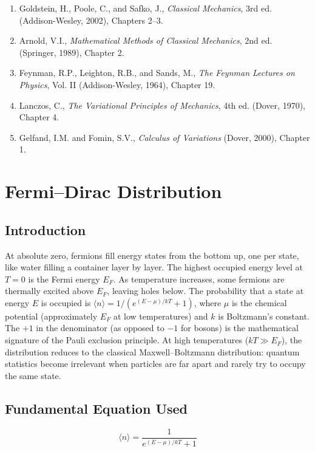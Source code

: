 \documentclass[11pt,openright]{book}
\begin{document}
\begin{enumerate}
\item Goldstein, H., Poole, C., and Safko, J., \textit{Classical Mechanics}, 3rd ed. (Addison-Wesley, 2002), Chapters 2--3.
\item Arnold, V.I., \textit{Mathematical Methods of Classical Mechanics}, 2nd ed. (Springer, 1989), Chapter 2.
\item Feynman, R.P., Leighton, R.B., and Sands, M., \textit{The Feynman Lectures on Physics}, Vol. II (Addison-Wesley, 1964), Chapter 19.
\item Lanczos, C., \textit{The Variational Principles of Mechanics}, 4th ed. (Dover, 1970), Chapter 4.
\item Gelfand, I.M. and Fomin, S.V., \textit{Calculus of Variations} (Dover, 2000), Chapter 1.
\end{enumerate}


\chapter{Fermi--Dirac Distribution}

\section*{Introduction}

At absolute zero, fermions fill energy states from the bottom up, one per state, like water filling a container layer by layer. The highest occupied energy level at $T = 0$ is the Fermi energy $E_F$. As temperature increases, some fermions are thermally excited above $E_F$, leaving holes below. The probability that a state at energy $E$ is occupied is $\langle n \rangle = 1/(e^{(E-\mu)/kT} + 1)$, where $\mu$ is the chemical potential (approximately $E_F$ at low temperatures) and $k$ is Boltzmann's constant. The $+1$ in the denominator (as opposed to $-1$ for bosons) is the mathematical signature of the Pauli exclusion principle. At high temperatures ($kT \gg E_F$), the distribution reduces to the classical Maxwell--Boltzmann distribution: quantum statistics become irrelevant when particles are far apart and rarely try to occupy the same state.
\section*{Fundamental Equation Used}

\[
\langle n \rangle = \frac{1}{e^{(E-\mu)/kT}+1}
\]
\end{document}
